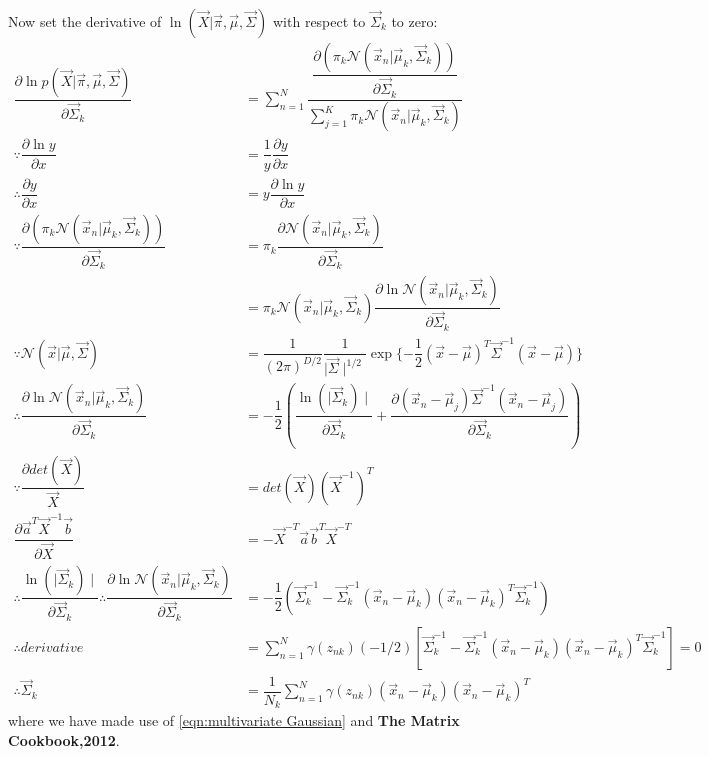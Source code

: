 Now set the derivative of $\ln(\vec{X}|\vec{\pi},\vec{\mu},\vec{\Sigma})$ with respect to $\vec{\Sigma}_k$ to zero:
\begin{align}
\dfrac{\partial\ln p(\vec{X}|\vec{\pi},\vec{\mu},\vec{\Sigma})}{\partial\vec{\Sigma}_k} 
&=\sum_{n=1}^{N}\dfrac{\dfrac{\partial(\pi_k\mathcal{N}(\vec{x}_n|\vec{\mu}_k,\vec{\Sigma}_k))}{\partial\vec{\Sigma}_k}}
{\sum_{j=1}^{K}\pi_k\mathcal{N}(\vec{x}_n|\vec{\mu}_k,\vec{\Sigma}_k)}\\
\because
 \dfrac{\partial \ln y}{\partial x} &= \dfrac{1}{y}\dfrac{\partial y}{\partial x} \\
\therefore \dfrac{\partial y}{\partial x} &= y\dfrac{\partial\ln y}{\partial x}\\
\because \dfrac{\partial(\pi_k\mathcal{N}(\vec{x}_n|\vec{\mu}_k,\vec{\Sigma}_k))}{\partial\vec{\Sigma}_k} 
&= \pi_k\dfrac{\partial\mathcal{N}(\vec{x}_n|\vec{\mu}_k,\vec{\Sigma}_k)}{\partial\vec{\Sigma}_k}\\
&= \pi_k\mathcal{N}(\vec{x}_n|\vec{\mu}_k,\vec{\Sigma}_k)
\dfrac{\partial\ln\mathcal{N}(\vec{x}_n|\vec{\mu}_k,\vec{\Sigma}_k)}{\partial\vec{\Sigma}_k}\\
\because 
\mathcal{N}(\vec{x}|\vec{\mu},\vec{\Sigma})
&=\dfrac{1}{(2\pi)^{D/2}}\dfrac{1}{\mid \vec{\Sigma}\mid^{1/2}}
\exp\{-\dfrac{1}{2}(\vec{x}-\vec{\mu})^T\vec{\Sigma}^{-1}(\vec{x}-\vec{\mu}) \} \\
\therefore \dfrac{\partial\ln\mathcal{N}(\vec{x}_n|\vec{\mu}_k,\vec{\Sigma}_k)}{\partial\vec{\Sigma}_k}
&=-\dfrac{1}{2}(\dfrac{\ln(\mid\vec{\Sigma}_k)\mid}{\partial\vec{\Sigma}_k}
 +\dfrac{\partial(\vec{x}_n-\vec{\mu}_j)\vec{\Sigma}^{-1}(\vec{x}_n-\vec{\mu}_j)}{\partial\vec{\Sigma}_k}) \\
\because
 \dfrac{\partial det(\vec{X})}{\vec{X}} &=det(\vec{X})(\vec{X}^{-1})^T \\
\dfrac{\partial\vec{a}^T\vec{X}^{-1}\vec{b}}{\partial\vec{X}}
&= -\vec{X}^{-T}\vec{a}\vec{b}^T\vec{X}^{-T} \\
\therefore 
\dfrac{\ln(\mid\vec{\Sigma}_k)\mid}{\partial\vec{\Sigma}_k}
\therefore 
\dfrac{\partial\ln\mathcal{N}(\vec{x}_n|\vec{\mu}_k,\vec{\Sigma}_k)}{\partial\vec{\Sigma}_k} 
&=-\dfrac{1}{2}(\vec{\Sigma}_k^{-1}-\vec{\Sigma}_k^{-1}(\vec{x}_n-\vec{\mu}_k)(\vec{x}_n-\vec{\mu}_k)^T\vec{\Sigma}_k^{-1}) \\
\therefore derivative&=\sum_{n=1}^{N}\gamma(z_{nk})(-1/2)[\vec{\Sigma}_k^{-1}-\vec{\Sigma}_k^{-1}(\vec{x}_n-\vec{\mu}_k)(\vec{x}_n-\vec{\mu}_k)^T\vec{\Sigma}_k^{-1}] =0 \\
\therefore \vec{\Sigma}_k&=\dfrac{1}{N_k}\sum_{n=1}^{N}\gamma(z_{nk})(\vec{x}_n-\vec{\mu}_k)(\vec{x}_n-\vec{\mu}_k)^T
\end{align}
where we have made use of \ref{eqn:multivariate Gaussian} and \textbf{The Matrix Cookbook,2012}.

